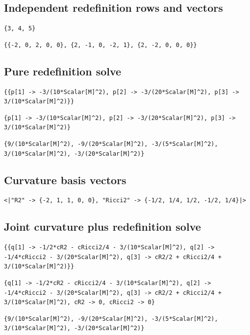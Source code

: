 \documentclass[11pt]{article}
\begin{document}
\subsection{Independent redefinition rows and vectors}
\begin{verbatim}
{3, 4, 5}
\end{verbatim}
\begin{verbatim}
{{-2, 0, 2, 0, 0}, {2, -1, 0, -2, 1}, {2, -2, 0, 0, 0}}
\end{verbatim}
\subsection{Pure redefinition solve}
\begin{verbatim}
{{p[1] -> -3/(10*Scalar[M]^2), p[2] -> -3/(20*Scalar[M]^2), p[3] -> 3/(10*Scalar[M]^2)}}
\end{verbatim}
\begin{verbatim}
{p[1] -> -3/(10*Scalar[M]^2), p[2] -> -3/(20*Scalar[M]^2), p[3] -> 3/(10*Scalar[M]^2)}
\end{verbatim}
\begin{verbatim}
{9/(10*Scalar[M]^2), -9/(20*Scalar[M]^2), -3/(5*Scalar[M]^2), 3/(10*Scalar[M]^2), -3/(20*Scalar[M]^2)}
\end{verbatim}
\subsection{Curvature basis vectors}
\begin{verbatim}
<|"R2" -> {-2, 1, 1, 0, 0}, "Ricci2" -> {-1/2, 1/4, 1/2, -1/2, 1/4}|>
\end{verbatim}
\subsection{Joint curvature plus redefinition solve}
\begin{verbatim}
{{q[1] -> -1/2*cR2 - cRicci2/4 - 3/(10*Scalar[M]^2), q[2] -> -1/4*cRicci2 - 3/(20*Scalar[M]^2), q[3] -> cR2/2 + cRicci2/4 + 3/(10*Scalar[M]^2)}}
\end{verbatim}
\begin{verbatim}
{q[1] -> -1/2*cR2 - cRicci2/4 - 3/(10*Scalar[M]^2), q[2] -> -1/4*cRicci2 - 3/(20*Scalar[M]^2), q[3] -> cR2/2 + cRicci2/4 + 3/(10*Scalar[M]^2), cR2 -> 0, cRicci2 -> 0}
\end{verbatim}
\begin{verbatim}
{9/(10*Scalar[M]^2), -9/(20*Scalar[M]^2), -3/(5*Scalar[M]^2), 3/(10*Scalar[M]^2), -3/(20*Scalar[M]^2)}
\end{verbatim}
\end{document}
